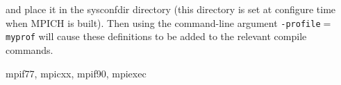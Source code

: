and place it in the sysconfdir directory (this directory is set at
configure time when MPICH is built).  Then using the command-line
argument {\tt -profile$=$myprof} will cause these
definitions to be added to the relevant compile commands.
\par
{}
 mpif77, mpicxx, mpif90, mpiexec
\nextline
{}
\endmanpage
